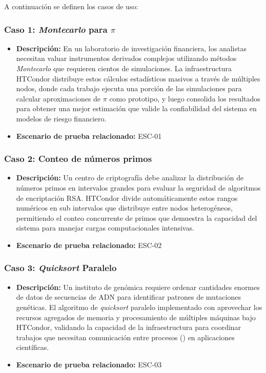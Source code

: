 A continuación se definen los casos de uso:

\subsubsection{Caso 1: \textit{Montecarlo} para $\pi$}
\noindent
\begin{itemize}
    \item \textbf{Descripción:} En un laboratorio de investigación financiera, los analistas necesitan valuar instrumentos derivados complejos utilizando métodos \textit{Montecarlo} que requieren cientos de simulaciones. La infraestructura HTCondor distribuye estos cálculos estadísticos masivos a través de múltiples nodos, donde cada trabajo ejecuta una porción de las simulaciones para calcular aproximaciones de $\pi$ como prototipo, y luego consolida los resultados para obtener una mejor estimación que valide la confiabilidad del sistema en modelos de riesgo financiero.
    \item \textbf{Escenario de prueba relacionado:} ESC-01
\end{itemize}

\subsubsection{Caso 2: Conteo de números primos}
\noindent
\begin{itemize}
    \item \textbf{Descripción:} Un centro de criptografía debe analizar la distribución de números primos en intervalos grandes para evaluar la seguridad de algoritmos de encriptación RSA. HTCondor divide automáticamente estos rangos numéricos en sub intervalos que distribuye entre nodos heterogéneos, permitiendo el conteo concurrente de primos que demuestra la capacidad del sistema para manejar cargas computacionales intensivas.
    \item \textbf{Escenario de prueba relacionado:} ESC-02
\end{itemize}

\subsubsection{Caso 3: \textit{Quicksort} Paralelo}
\noindent
\begin{itemize}
    \item \textbf{Descripción:} Un instituto de genómica requiere ordenar cantidades enormes de datos de secuencias de ADN para identificar patrones de mutaciones genéticas. El algoritmo de \textit{quicksort} paralelo implementado con \MPI aprovechar los recursos agregados de memoria y procesamiento de múltiples máquinas bajo HTCondor, validando la capacidad de la infraestructura para coordinar trabajos que necesitan comunicación entre procesos (\IPC) en aplicaciones científicas.
    \item \textbf{Escenario de prueba relacionado:} ESC-03
\end{itemize}

